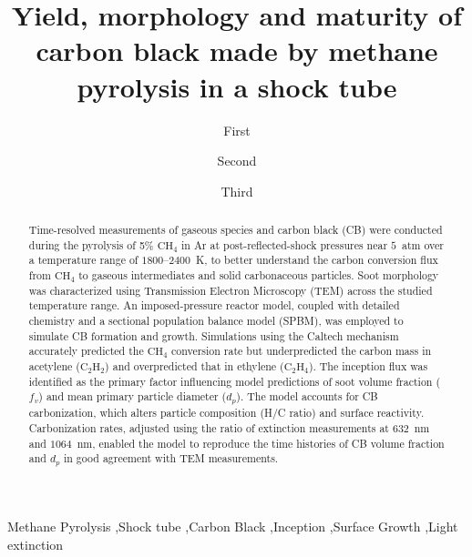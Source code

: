 
\newcommand{\papertitle}{Yield, morphology and maturity of carbon black made by methane pyrolysis in a shock tube}

\begin{frontmatter}
\title{
    \papertitle
}

\author[1]{First }

\author[2]{Second }

\author[3]{Third }


\address{\textsuperscript{1} Address}


\begin{abstract}
Time-resolved measurements of gaseous species and carbon black (CB) were conducted during the pyrolysis of 5\% $\mathrm{CH_4}$ in Ar at post-reflected-shock pressures near $5$~atm over a temperature range of $1800$–$2400$~K, to better understand the carbon conversion flux from $\mathrm{CH_4}$ to gaseous intermediates and solid carbonaceous particles. Soot morphology was characterized using Transmission Electron Microscopy (TEM) across the studied temperature range. An imposed-pressure reactor model, coupled with detailed chemistry and a sectional population balance model (SPBM), was employed to simulate CB formation and growth. Simulations using the Caltech mechanism accurately predicted the $\mathrm{CH_4}$ conversion rate but underpredicted the carbon mass in acetylene ($\mathrm{C_2H_2}$) and overpredicted that in ethylene ($\mathrm{C_2H_4}$). The inception flux was identified as the primary factor influencing model predictions of soot volume fraction ($f_v$) and mean primary particle diameter ($d_p$). The model accounts for CB carbonization, which alters particle composition (H/C ratio) and surface reactivity. Carbonization rates, adjusted using the ratio of extinction measurements at $632$~nm and $1064$~nm, enabled the model to reproduce the time histories of CB volume fraction and $d_p$ in good agreement with TEM measurements.


\end{abstract}

\begin{keyword}
	\KWD Methane Pyrolysis \sep Shock tube \sep Carbon Black \sep Inception \sep Surface Growth \sep Light extinction 
\end{keyword}

\end{frontmatter}

